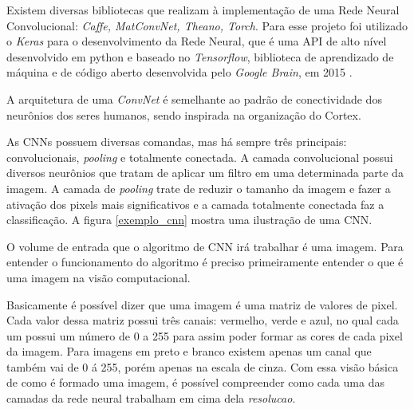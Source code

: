 Existem diversas bibliotecas que realizam à implementação de uma Rede Neural Convolucional: \textit{Caffe, MatConvNet, Theano, Torch}. Para esse projeto foi utilizado o \textit{Keras} para o desenvolvimento da Rede Neural, que é uma API de alto nível desenvolvido em python e baseado no \textit{Tensorflow}, biblioteca de aprendizado de máquina  e de código aberto desenvolvida pelo \textit{Google Brain}, em 2015 \cite{redesneuraisconv,keras,tensorflow}.

A arquitetura de uma \textit{ConvNet} é semelhante ao padrão de conectividade dos neurônios dos seres humanos, sendo inspirada na organização do Cortex. \cite{conv1}

 As CNNs possuem diversas comandas, mas há sempre três principais: convolucionais, \textit{pooling} e totalmente conectada. A camada convolucional possui diversos neurônios que tratam de aplicar um filtro em uma determinada parte da imagem. A camada de \textit{pooling} trate de reduzir o tamanho da imagem e fazer a ativação dos pixels mais significativos e a camada totalmente conectada faz a classificação. A figura \ref{exemplo_cnn} mostra uma ilustração de uma CNN.

\begin{figure}[H]
	\centering
\end{figure}

O volume de entrada que o algoritmo de CNN irá trabalhar é uma imagem. Para entender o funcionamento do algoritmo é preciso primeiramente entender o que é uma imagem na visão computacional\cite{conv2}. 

Basicamente é possível dizer que uma imagem é uma matriz de valores de pixel. Cada valor dessa matriz possui três canais: vermelho, verde e azul, no qual cada um possui um número de 0 a 255 para assim poder formar as cores de cada pixel da imagem. Para imagens em preto e branco existem apenas um canal que também vai de 0 á 255, porém apenas na escala de cinza. 
Com essa visão básica de como é formado uma imagem, é possível compreender como cada uma das camadas da rede neural trabalham em cima dela \textit{resolucao}.

